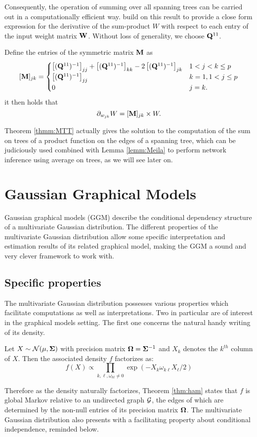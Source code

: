 Consequently, the operation of summing over all spanning trees can be carried out in a computationally efficient way. \cite{MeilaJaak}  build on this result to provide a close form expression for the derivative of the sum-product $W$ with respect to each entry of the input weight matrix ${\bf W}$.   Without loss of generality, we choose ${\bf Q}^{11}$.

\begin{lemma}  \label{lemm:Meila}
    Define the entries of the symmetric matrix ${\bf M}$ as
\[    
 [{\bf M}]_{jk} =\begin{cases}
    \left[({\bf Q}^{11})^{-1}\right]_{jj} + \left[({\bf Q}^{11})^{-1}\right]_{kk} -2\left[({\bf Q}^{11})^{-1}\right]_{jk} & 1< j<k \leq p\\
    \left[({\bf Q}^{11})^{-1}\right]_{jj} & k=1, 1< j \leq p  \\
    0 &  j=k .
    \end{cases}
\] 
it then holds that
$$\partial_{w_{jk}} W = [{\bf M}]_{jk}  \times W.$$
\end{lemma}

Theorem \ref{thmm:MTT} actually gives the solution to the computation of the sum on trees of a product function on the edges of a spanning tree, which can be judiciously used combined with  Lemma \ref{lemm:Meila} to perform network inference using average on trees, as we will see later on. 

 \section{Gaussian Graphical Models}
 Gaussian graphical models (GGM) describe the conditional dependency structure of a  multivariate Gaussian distribution. The different properties of the multivariate Gaussian distribution allow some specific interpretation and estimation results of its related graphical model,  making the GGM a sound and very clever framework to work with.
 
 \subsection{Specific properties} \label{ggm:prop}
The multivariate Gaussian distribution possesses various properties which facilitate computations as well as interpretations. Two in particular are of interest in the graphical models setting. The first one concerns the natural handy writing of its density.
 \begin{prop}\label{pp:ggm1}
 Let $X\sim \mathcal{N}(\mu, {\boldsymbol{\Sigma}})$ with precision matrix ${\boldsymbol{\Omega}}={\boldsymbol{\Sigma}}^{-1}$ and $X_k$ denotes the $k^{th}$ column of $X$. Then the associated density $f$ factorizes as:
 $$f(X) \propto \prod_{k,\ell, \omega_{kl}\neq 0} \exp(-X_{k}\omega_{k\ell}X_{\ell}/2)$$
 \end{prop}
 Therefore as the density naturally factorizes, Theorem \ref{thm:ham} states that $f$ is global Markov relative to an undirected graph $\mathcal{G}$, the edges of which are determined by the non-null entries of its precision matrix ${\boldsymbol{\Omega}}$.  The multivariate Gaussian distribution also presents with a facilitating property about conditional independence, reminded below.
 
